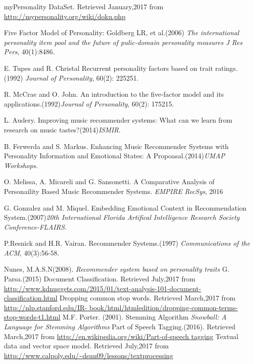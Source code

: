 
\newpage
{}
{}
\begin{thebibliography}{9}
		myPersonality DataSet. Retrieved January,2017 from \url{ http://mypersonality.org/wiki/doku.php}

	 Five Factor Model of Personality: Goldberg LR, et al.(2006) \textit{The international personality item pool and the future of pulic-domain personality measures J Res Pers}, 40(1):8486.

 E. Tupes and R. Christal Recurrent personality factors based on trait ratings.(1992) \textit{Journal of Personality}, 60(2): 225251.

 R. McCrae and O. John. An introduction to the five-factor model and its applications.(1992)\textit{Journal of Personality}, 60(2): 175215.

 L. Audery. Improving music recommender systems: What can we learn from research on music tastes?(2014)\textit{ISMIR}.

 B. Ferwerda and S. Markus. Enhancing Music Recommender Systems with Personality Information and Emotional States: A Propoasal.(2014)\textit{UMAP Workshops}.

	 O. Melissa, A. Micareli and G. Sansonetti. A Comparative Analysis of Personaility Based Music Recommender Systems. \textit{EMPIRE RecSys}, 2016

 G. Gonzalez and M. Miquel. Embedding Emotional Context in Recommendation System.(2007)\textit{20th International Florida Artifical Intelligence Research Society Conference-FLAIRS}.

 P.Resnick and H.R. Vairan. Recommender Systems.(1997) \textit{Communications of the ACM}, 40(3):56-58.

Nunes, M.A.S.N(2008). \textit{Recommender system based on personality traits}
	G. Parsa.(2015) Document Classification. Retrieved July,2017 from \url{http://www.kdnuggets.com/2015/01/text-analysis-101-document-classification.html}
	Dropping common stop words. Retrieved March,2017 from \url{http://nlp.stanford.edu/IR- book/html/htmledition/dropping-common-terms-stop-words-t1.html}
	M.F. Porter. (2001). Stemming Algorithm \textit{Snowball: A Language for Stemming Algorithms}
 Part of Speech Tagging.(2016). Retrieved March,2017 from \url{http://en.wikipedia.org/wiki/Part-of-speech tagging}
Textual data and vector space model. Retrieved July,2017 from \url{http://www.calpoly.edu/~dsun09/lessons/textprocessing}


\end{thebibliography}
